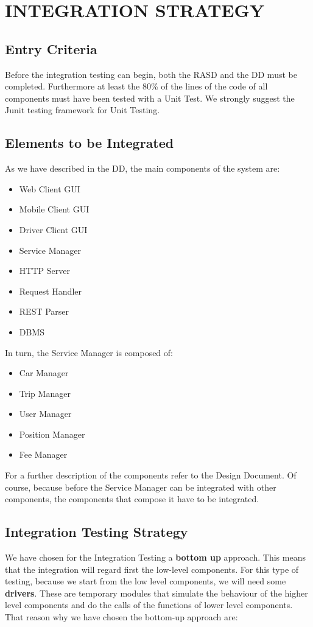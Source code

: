 \section{INTEGRATION STRATEGY}
\subsection{Entry Criteria} 
Before the integration testing can begin, both the RASD and the DD must be completed. Furthermore at least the 80\% of the lines of the code of all components must have been tested with a Unit Test. We strongly suggest the Junit testing framework for Unit Testing.
\subsection{Elements to be Integrated} 
As we have described in the DD, the main components of the system are:
\begin{itemize}
\item Web Client GUI
\item Mobile Client GUI
\item Driver Client GUI
\item Service Manager 
\item HTTP Server
\item Request Handler
\item REST Parser
\item DBMS
\end{itemize}

In turn, the Service Manager is composed of:
\begin{itemize}
\item Car Manager
\item Trip Manager
\item User Manager
\item Position Manager
\item Fee Manager
\end{itemize}
\noindent
For a further description of the components refer to the Design Document. 
\newline 
Of course, because before the Service Manager can be integrated with other components, the components that compose it have to be integrated.


\subsection{Integration Testing Strategy} 

We have chosen for the Integration Testing a \textbf{bottom up} approach. This means that the integration will regard first the low-level components. For this type of testing, because we start from the low level components, we will need some \textbf{drivers}. These are temporary modules that simulate the behaviour of the higher level components and do the calls of the functions of lower level components. \newline
That reason why we have chosen the bottom-up approach are:

